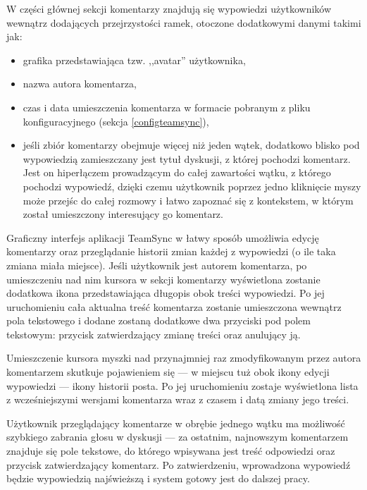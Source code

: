 W części głównej sekcji komentarzy znajdują się wypowiedzi użytkowników wewnątrz dodających przejrzystości ramek, otoczone dodatkowymi danymi takimi jak:

\begin{itemize}[noitemsep]
  \item grafika przedstawiająca tzw. ,,avatar'' użytkownika,
  
  \item nazwa autora komentarza,
  
  \item czas i data umieszczenia komentarza w formacie pobranym z pliku konfiguracyjnego (sekcja \ref{configteamsync}),
  
  \item jeśli zbiór komentarzy obejmuje więcej niż jeden wątek, dodatkowo blisko pod wypowiedzią zamieszczany jest tytuł dyskusji, z której pochodzi komentarz. Jest on hiperłączem prowadzącym do całej zawartości wątku, z którego pochodzi wypowiedź, dzięki czemu użytkownik poprzez jedno kliknięcie myszy może przejśc do całej rozmowy i łatwo zapoznać się z kontekstem, w którym został umieszczony interesujący go komentarz.
\end{itemize}

Graficzny interfejs aplikacji TeamSync w łatwy sposób umożliwia edycję komentarzy oraz przeglądanie historii zmian każdej z wypowiedzi (o ile taka zmiana miała miejsce). Jeśli użytkownik jest autorem komentarza, po umieszczeniu nad nim kursora w sekcji komentarzy wyświetlona zostanie dodatkowa ikona przedstawiająca długopis obok treści wypowiedzi. Po jej uruchomieniu cała aktualna treść komentarza zostanie umieszczona wewnątrz pola tekstowego i dodane zostaną dodatkowe dwa przyciski pod polem tekstowym: przycisk zatwierdzający zmianę treści oraz anulujący ją.

Umieszczenie kursora myszki nad przynajmniej raz zmodyfikowanym przez autora komentarzem skutkuje pojawieniem się --- w miejscu tuż obok ikony edycji wypowiedzi --- ikony historii posta. Po jej uruchomieniu zostaje wyświetlona lista z wcześniejszymi wersjami komentarza wraz z czasem i datą zmiany jego treści.

Użytkownik przeglądający komentarze w obrębie jednego wątku ma możliwość szybkiego zabrania głosu w dyskusji --- za ostatnim, najnowszym komentarzem znajduje się pole tekstowe, do którego wpisywana jest treść odpowiedzi oraz przycisk zatwierdzający komentarz. Po zatwierdzeniu, wprowadzona wypowiedź będzie wypowiedzią najświeższą i system gotowy jest do dalszej pracy.

